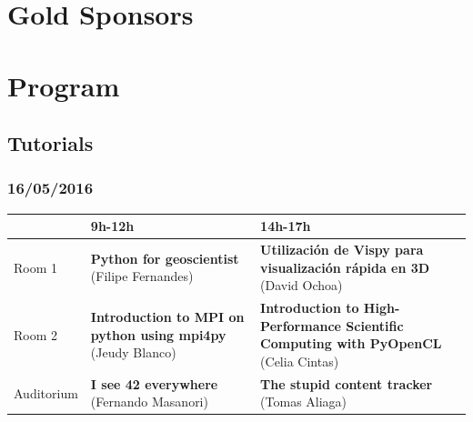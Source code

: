 \documentclass[12pt]{article}
\begin{document}
\newpage

\section*{Gold Sponsors}
\begin{minipage}{0.4\textwidth}

\end{minipage}
\hfill
\begin{minipage}{0.4\textwidth}

\end{minipage}

\vspace*{1cm}

\begin{minipage}{0.4\textwidth}

\end{minipage}
\hfill
\begin{minipage}{0.4\textwidth}

\end{minipage}

\newpage

\section*{Program}

\subsection*{Tutorials}

\subsubsection*{16/05/2016}

\begin{center}
   {\footnotesize{%
       \begin{tabular}{@{}l p{5cm} p{5cm}@{}}
     \toprule
      & 9h-12h & 14h-17h\\\midrule
     Room 1 & \textbf{Python for geoscientist} (Filipe Fernandes) & \textbf{Utilización de Vispy para visualización rápida en 3D} (David Ochoa)\\
     Room 2 & \textbf{Introduction to MPI on python using mpi4py} (Jeudy Blanco) & \textbf{Introduction to High-Performance Scientific Computing with PyOpenCL} (Celia Cintas)\\
     Auditorium & \textbf{I see 42 everywhere} (Fernando Masanori) & \textbf{The stupid content tracker} (Tomas Aliaga)\\\bottomrule
   \end{tabular}
 }}
\end{center}
\end{document}
